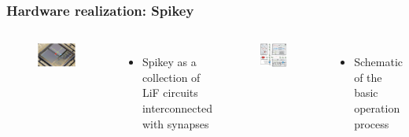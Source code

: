 \documentclass{beamer}
\begin{document}
\begin{frame}
	\frametitle{Hardware realization: Spikey}
	\begin{columns}
          	\begin{figure}
    				\centering
    				\includegraphics[width=\linewidth]{figures/script_spikey_image.png}
 		   \end{figure}
 		   \begin{itemize}
          		\item Spikey as a collection of LiF circuits interconnected with synapses
          	\end{itemize}
          
          \begin{figure}
    				\centering
    				\includegraphics[width=\linewidth]{figures/script_spikey_schematic.png}
 		   \end{figure}
 		   \begin{itemize}
          		\item Schematic of the basic operation process
          	\end{itemize}
          	
	\end{columns}
\end{frame}
\end{document}
